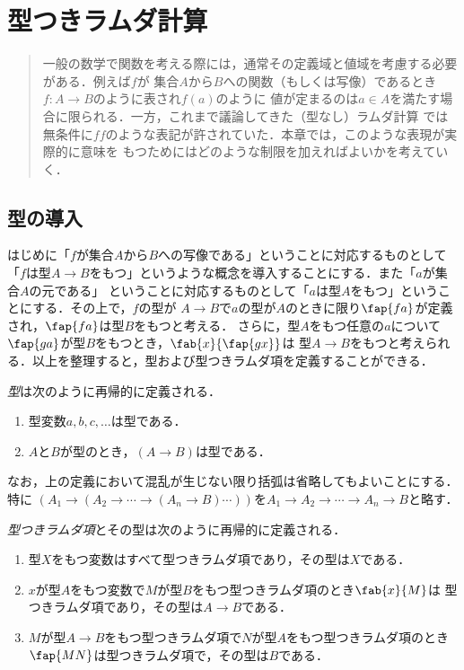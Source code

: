 \documentclass[uplatex,dvipdfmx,report,fleqn]{jsbook}
\begin{document}
\chapter{型つきラムダ計算}

\begin{abstract}
一般の数学で関数を考える際には，通常その定義域と値域を考慮する必要がある．例えば$f$が
集合$A$から$B$への関数（もしくは写像）であるとき$f: A\to B$のように表され$f(a)$のように
値が定まるのは$a\in A$を満たす場合に限られる．一方，これまで議論してきた（型なし）ラムダ計算
では無条件に$ff$のような表記が許されていた．本章では，このような表現が実際的に意味を
もつためにはどのような制限を加えればよいかを考えていく．
\end{abstract}

\section{型の導入}

はじめに「$f$が集合$A$から$B$への写像である」ということに対応するものとして
「$f$は型$A\to B$をもつ」というような概念を導入することにする．また「$a$が集合$A$の元である」
ということに対応するものとして「$a$は型$A$をもつ」ということにする．その上で，$f$の型が
$A\to B$で$a$の型が$A$のときに限り$\fap{fa}$が定義され，$\fap{fa}$は型$B$をもつと考える．
さらに，型$A$をもつ任意の$a$について$\fap{ga}$が型$B$をもつとき，$\fab{x}{\fap{gx}}$は
型$A\to B$をもつと考えられる．以上を整理すると，型および型つきラムダ項を定義することができる．
%
\begin{definition}[型]
\emph{型}は次のように再帰的に定義される．
%
\begin{enumerate}
\item 型変数$a,b,c,\dots$は型である．
\item $A$と$B$が型のとき，$(A\to B)$は型である．
\end{enumerate}
\end{definition}
%
なお，上の定義において混乱が生じない限り括弧は省略してもよいことにする．特に
$(A_1\to(A_2\to\cdots\to(A_n\to B)\cdots))$を$A_1\to A_2\to\cdots\to A_n\to B$と略す．
%
\begin{definition}[型つきラムダ項]
\emph{型つきラムダ項}とその型は次のように再帰的に定義される．
%
\begin{enumerate}
\item 型$X$をもつ変数はすべて型つきラムダ項であり，その型は$X$である．
\item $x$が型$A$をもつ変数で$M$が型$B$をもつ型つきラムダ項のとき$\fab{x}{M}$は
型つきラムダ項であり，その型は$A\to B$である．
\item $M$が型$A\to B$をもつ型つきラムダ項で$N$が型$A$をもつ型つきラムダ項のとき
$\fap{MN}$は型つきラムダ項で，その型は$B$である．
\end{enumerate}
\end{definition}
\end{document}

